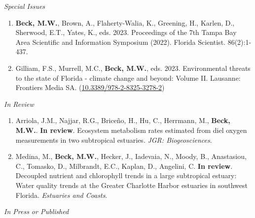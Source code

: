\documentclass[letterpaper,12pt]{article}
\newcommand{\subsectitle}[1]{\vspace{\baselineskip} \centerline{\normalsize{\textit{#1}}}}
\begin{document}
\subsectitle{Special Issues}

\begin{enumerate}

\item \textbf{Beck, M.W.}, Brown, A., Flaherty-Walia, K., Greening, H., Karlen, D., Sherwood, E.T., Yates, K., eds. 2023. Proceedings of the 7th Tampa Bay Area Scientific and Information Symposium (2022). Florida Scientist. 86(2):1-437.

\item Gilliam, F.S., Murrell, M.C., \textbf{Beck, M.W.}, eds. 2023. Environmental threats to the state of Florida - climate change and beyond: Volume II. Lausanne: Frontiers Media SA. ({\footnotesize\href{https://doi.org/10.3389/978-2-8325-3278-2}{10.3389/978-2-8325-3278-2}}) 

\end{enumerate}

\subsectitle{In Review}

\begin{enumerate}

\item Arriola, J.M., Najjar, R.G., Brice\~{n}o, H., Hu, C., Herrmann, M., \textbf{Beck, M.W.}. \textbf{In review}. Ecosystem metabolism rates estimated from diel oxygen measurements in two subtropical estuaries. \textit{JGR: Biogeosciences}.

\item Medina, M., \textbf{Beck, M.W.}, Hecker, J., Iadevaia, N., Moody, B., Anastasiou, C., Tomasko, D., Milbrandt, E.C., Kaplan, D., Angelini, C. \textbf{In review}. Decoupled nutrient and chlorophyll trends in a large subtropical estuary: Water quality trends at the Greater Charlotte Harbor estuaries in southwest Florida. \textit{Estuaries and Coasts}.


\end{enumerate}

\subsectitle{In Press or Published}
\end{document}
